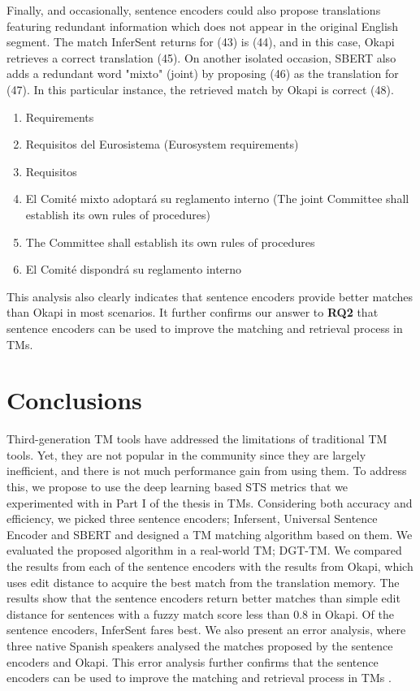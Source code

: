 Finally, and occasionally, sentence encoders could also propose translations featuring redundant information which does not appear in the original English segment. The match InferSent returns for (43) is (44), and in this case, Okapi retrieves a correct translation (45). On another isolated occasion, SBERT also adds a redundant word "mixto" (joint) by proposing (46) as the translation for (47). In this particular instance, the retrieved match by Okapi is correct (48). 

\begin{enumerate}[resume,label={(\arabic*)}]
\item	Requirements
\item	Requisitos del Eurosistema (Eurosystem requirements)
\item	Requisitos
\item	El Comité mixto adoptará su reglamento interno (The joint Committee shall establish its own rules of procedures)
\item	The Committee shall establish its own rules of procedures
\item	El Comité dispondrá su reglamento interno
\end{enumerate}

This analysis also clearly indicates that sentence encoders provide better matches than Okapi in most scenarios. It further confirms our answer to \textbf{RQ2} that sentence encoders can be used to improve the matching and retrieval process in TMs.

\section{Conclusions}
Third-generation TM tools have addressed the limitations of traditional TM tools. Yet, they are not popular in the community since they are largely inefficient, and there is not much performance gain from using them. To address this, we propose to use the deep learning based STS metrics that we experimented with in Part I of the thesis in TMs. Considering both accuracy and efficiency, we picked three sentence encoders; Infersent, Universal Sentence Encoder and SBERT and designed a TM matching algorithm based on them. We evaluated the proposed algorithm in a real-world TM; DGT-TM. We compared the results from each of the sentence encoders with the results from Okapi, which uses edit distance to acquire the best match from the translation memory.  The results show that the sentence encoders return better matches than simple edit distance for sentences with a fuzzy match score less than 0.8 in Okapi. Of the sentence encoders, InferSent fares best. We also present an error analysis, where three native Spanish speakers analysed the matches proposed by the sentence encoders and Okapi. This error analysis further confirms that the sentence encoders can be used to improve the matching and retrieval process in TMs \autocite{ranasinghe-etal-2020-intelligent}. 

